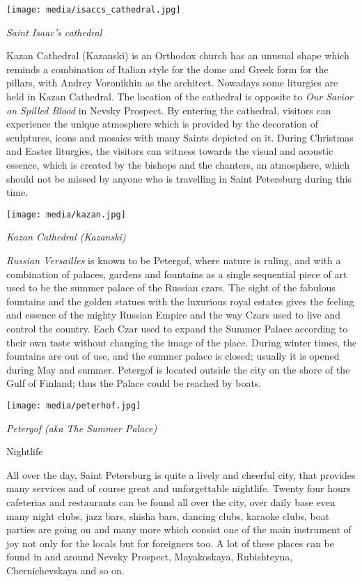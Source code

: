 \documentclass[10pt,a4paper]{article} %
\newcommand{\NewsItem}[1]{ %
\usefont{T1}{fvs}{n}{n} %
\vspace{24pt}\large #1\vspace{3pt} %
\par \normalsize \normalfont}
\begin{document}
\begin{multicols}{3}
\begin{center}
	\texttt{[image: media/isaccs\_cathedral.jpg]}
	\par\textit{Saint Isaac's cathedral}
\end{center}

Kazan Cathedral (Kazanski) is an Orthodox church has an unusual shape which 
reminds a combination of Italian style for the dome and Greek form for the pillars, 
with Andrey Voronikhin as the architect. 
Nowadays some liturgies are held in Kazan Cathedral. 
The location of the cathedral is opposite to \textit{Our Savior on Spilled Blood} 
in Nevsky Prospect. 
By entering the cathedral, visitors can experience the unique atmosphere 
which is provided by the decoration of sculptures, 
icons and mosaics with many Saints depicted on it. 
During Christmas and Easter liturgies, the visitors can witness towards the visual
and acoustic essence, which is created by the bishops and the chanters, an atmosphere, 
which should not be missed by anyone who is travelling in Saint Petersburg during this time.

\begin{center}
	\texttt{[image: media/kazan.jpg]}
	\par\textit{Kazan Cathedral (Kazanski)}
\end{center}

\textit{Russian Versailles} is known to be Petergof, 
where nature is ruling, and with a combination of palaces, 
gardens and fountains as a single sequential piece of art used to be the summer palace 
of the Russian czars. 
The sight of the fabulous fountains and the golden statues with the luxurious 
royal estates gives the feeling and essence of the mighty Russian Empire and 
the way Czars used to live and control the country. 
Each Czar used to expand the Summer Palace according to their own taste without 
changing the image of the place. During winter times,
the fountains are out of use, and the summer palace is closed;
usually it is opened during May and summer.
Petergof is located outside the city on the shore of the Gulf of Finland; 
thus the Palace could be reached by boats.

\begin{center}
	\texttt{[image: media/peterhof.jpg]}
	\par\textit{Petergof (aka The Summer Palace)}
\end{center}

\NewsItem{Nightlife}
All over the day, Saint Petersburg is quite a lively and cheerful city, 
that provides many services and of course great and unforgettable nightlife. 
Twenty four hours cafeterias and restaurants can be found all over the city, 
over daily base even many night clubs, jazz bars, shisha bars, dancing clubs, 
karaoke clubs, boat parties are going on and many more which consist one 
of the main instrument of joy not only for the locals but for foreigners too. 
A lot of these places can be found in and around Nevsky Prospect, Mayakoskaya, 
Rubishteyna, Chernichevskaya and so on. 


\end{multicols}
\end{document}
